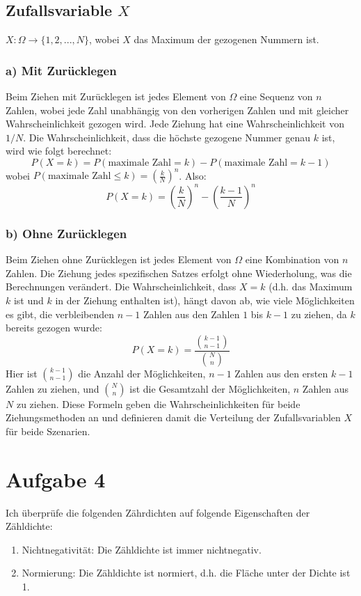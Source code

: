 \documentclass[a4paper]{scrartcl}
\begin{document}
\subsection*{Zufallsvariable \(X\)}
\(X : \Omega \rightarrow \{1, 2, ..., N\}\), wobei \(X\) das Maximum der gezogenen Nummern ist.

\subsubsection*{a) Mit Zurücklegen}
Beim Ziehen mit Zurücklegen ist jedes Element von \(\Omega\) eine Sequenz von \(n\) Zahlen, wobei jede Zahl unabhängig von den vorherigen Zahlen und mit gleicher Wahrscheinlichkeit gezogen wird. Jede Ziehung hat eine Wahrscheinlichkeit von \(1/N\).
Die Wahrscheinlichkeit, dass die höchste gezogene Nummer genau \(k\) ist, wird wie folgt berechnet:
\[
P(X = k) = P(\text{maximale Zahl} = k) - P(\text{maximale Zahl} = k - 1)
\]
wobei \(P(\text{maximale Zahl} \leq k) = \left(\frac{k}{N}\right)^n\). Also:
\[
P(X = k) = \left(\frac{k}{N}\right)^n - \left(\frac{k-1}{N}\right)^n
\]

\subsubsection*{b) Ohne Zurücklegen}
Beim Ziehen ohne Zurücklegen ist jedes Element von \(\Omega\) eine Kombination von \(n\) Zahlen. Die Ziehung jedes spezifischen Satzes erfolgt ohne Wiederholung, was die Berechnungen verändert.
Die Wahrscheinlichkeit, dass \(X = k\) (d.h. das Maximum \(k\) ist und \(k\) in der Ziehung enthalten ist), hängt davon ab, wie viele Möglichkeiten es gibt, die verbleibenden \(n-1\) Zahlen aus den Zahlen \(1\) bis \(k-1\) zu ziehen, da \(k\) bereits gezogen wurde:
\[
P(X = k) = \frac{{k-1 \choose n-1}}{{N \choose n}}
\]
Hier ist \({k-1 \choose n-1}\) die Anzahl der Möglichkeiten, \(n-1\) Zahlen aus den ersten \(k-1\) Zahlen zu ziehen, und \({N \choose n}\) ist die Gesamtzahl der Möglichkeiten, \(n\) Zahlen aus \(N\) zu ziehen.
Diese Formeln geben die Wahrscheinlichkeiten für beide Ziehungsmethoden an und definieren damit die Verteilung der Zufallsvariablen \(X\) für beide Szenarien.

\section*{Aufgabe 4}
Ich überprüfe die folgenden Zährdichten auf folgende Eigenschaften der Zähldichte:
\begin{enumerate}
  \item Nichtnegativität: Die Zähldichte ist immer nichtnegativ.
  \item Normierung: Die Zähldichte ist normiert, d.h. die Fläche unter der Dichte ist 1.
\end{enumerate}
\end{document}
